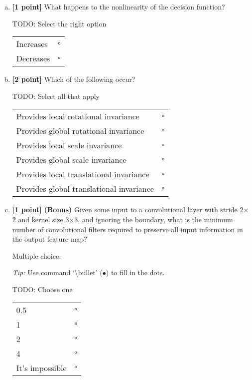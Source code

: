 \begin{enumerate}[(a)]
    \item \textbf{[1 point]}
    What happens to the nonlinearity of the decision function?
    \begin{mdframed}
    TODO: Select the right option

\begin{tabular}[h]{lr}
\toprule
Increases & $\square$ \\
Decreases & $\square$ \\
\bottomrule
\end{tabular}
    \end{mdframed}

\item \textbf{[2 point]}
Which of the following occur?

\begin{mdframed}
TODO: Select all that apply

\begin{tabular}[h]{lr}
\toprule
Provides local rotational invariance & $\square$ \\
Provides global rotational invariance & $\square$ \\
Provides local scale invariance & $\square$ \\
Provides global scale invariance & $\square$ \\
Provides local translational invariance & $\square$ \\
Provides global translational invariance & $\square$ \\
\bottomrule
\end{tabular}
\end{mdframed}


\item
\textbf{[1 point]} \textbf{(Bonus)} Given some input to a convolutional layer with stride 2$\times$2 and kernel size 3$\times$3, and ignoring the boundary, what is the minimum number of convolutional filters required to preserve all input information in the output feature map?

Multiple choice.

\emph{Tip:} Use command  `\textbackslash bullet' ($\bullet$) to fill in the dots.

\begin{mdframed}
TODO: Choose one

\begin{tabular}[h]{lc}
\toprule
0.5 & $\square$ \\
1 & $\square$ \\
2 & $\square$ \\
4 & $\square$ \\
It's impossible & $\square$ \\
\bottomrule
\end{tabular}
\end{mdframed}


\end{enumerate}
